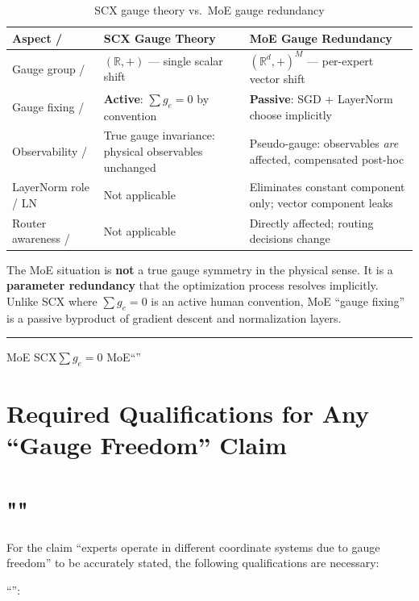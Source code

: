 \documentclass[11pt,a4paper]{article}
\newcommand{\R}{\mathbb{R}}
\begin{document}
\begin{table}[h]
\centering
\caption{SCX gauge theory vs.\ MoE gauge redundancy}
\begin{tabular}{@{}p{4cm}p{5.5cm}p{5.5cm}@{}}
\toprule
\textbf{Aspect / } & \textbf{SCX Gauge Theory} & \textbf{MoE Gauge Redundancy} \\
\midrule
Gauge group / 
    & $(\R, +)$ — single scalar shift
    & $(\R^d, +)^M$ — per-expert vector shift \\
Gauge fixing / 
    & \textbf{Active}: $\sum g_e = 0$ by convention
    & \textbf{Passive}: SGD + LayerNorm choose implicitly \\
Observability / 
    & True gauge invariance: physical observables unchanged
    & Pseudo-gauge: observables \textit{are} affected, compensated post-hoc \\
LayerNorm role / LN
    & Not applicable
    & Eliminates constant component only; vector component leaks \\
Router awareness / 
    & Not applicable
    & Directly affected; routing decisions change \\
\bottomrule
\end{tabular}
\end{table}

The MoE situation is \textbf{not} a true gauge symmetry in the physical sense.
It is a \textbf{parameter redundancy} that the optimization process resolves
implicitly. Unlike SCX where $\sum g_e = 0$ is an active human convention,
MoE ``gauge fixing'' is a passive byproduct of gradient descent and
normalization layers.

\medskip
\noindent\rule{\textwidth}{0.5pt}
MoE\textbf{}\textbf{}
SCX$\sum g_e = 0$
MoE``''

\section{Required Qualifications for Any ``Gauge Freedom'' Claim}
\section{""}

For the claim ``experts operate in different coordinate systems due to gauge
freedom'' to be accurately stated, the following qualifications are necessary:

\medskip
``'':
\end{document}

